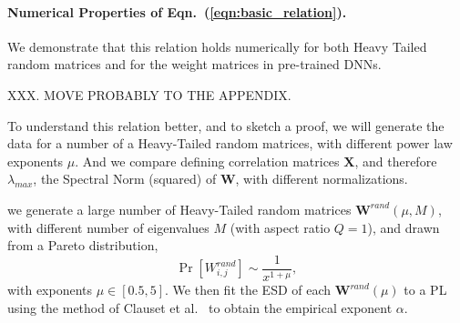 \paragraph{Numerical Properties of Eqn.~(\ref{eqn:basic_relation}).}

We demonstrate that this relation holds numerically for both Heavy Tailed random matrices and for the weight matrices in pre-trained DNNs. 

XXX.  MOVE PROBABLY TO THE APPENDIX.

To understand this relation better, and to sketch a proof,
we will generate the data for a number of a Heavy-Tailed random matrices, 
with different power law exponents $\mu$.
And we compare defining correlation matrices $\mathbf{X}$, and therefore $\lambda_{max}$,
the Spectral Norm (squared) of $\mathbf{W}$, with different normalizations.

we generate a large number of  Heavy-Tailed  random matrices $\mathbf{W}^{rand}(\mu,M)$, with different number of eigenvalues $M$ (with aspect ratio $Q=1$), and drawn from a Pareto distribution,
$$
\Pr[{W}^{rand}_{i,j}]\sim\dfrac{1}{x^{1+\mu}}  ,
$$
with exponents $\mu\in[0.5, 5]$.
%
We then fit the ESD of each $\mathbf{W}^{rand}(\mu)$ to a PL using the method of Clauset et al.~\cite{CSN09_powerlaw,ABP14} to obtain the empirical exponent $\alpha$.  



